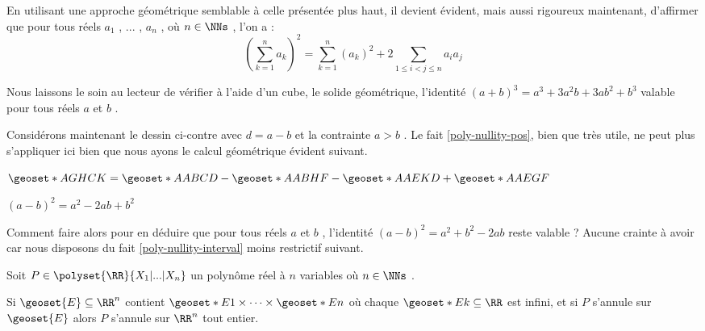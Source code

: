 

\begin{example}
	En utilisant une approche géométrique semblable à celle présentée plus haut, il devient évident, mais aussi rigoureux maintenant, d'affirmer que pour tous réels $a_1$ , ... , $a_n$ , où $n \in \NNs$ , l'on a :
\[
	\left( \sum_{k=1}^{n}a_k \right)^2
	=
	\sum_{k=1}^{n} \left( a_k \right)^2
	+
	2 \sum_{1 \leq i < j \leq n} a_i a_j
\]
\end{example}




\begin{example}
	Nous laissons le soin au lecteur de vérifier à l'aide d'un cube, le solide géométrique, l'identité $(a + b)^3 = a^3 + 3 a^2 b + 3 a b^2 + b^3$ valable pour tous réels $a$ et $b$ .
\end{example}




\medskip


\begin{figure} 
	\vspace{-.5em}
	\begin{center}
	\end{center}
	\vspace{-1.25em}
\end{figure} 


Considérons maintenant le dessin ci-contre avec $d = a - b$ et la contrainte $a > b$ . Le fait \ref{poly-nullity-pos}, bien que très utile, ne peut plus s'appliquer ici bien que nous ayons le calcul géométrique évident suivant.

\smallskip

$\geoset*{A}{GHCK} = \geoset*{A}{ABCD} - \geoset*{A}{ABHF} - \geoset*{A}{AEKD} + \geoset*{A}{AEGF}$
	
\smallskip
	
$(a-b)^2 = a^2 - 2ab + b^2$


\medskip

Comment faire alors pour en déduire que pour tous réels $a$ et $b$ , l'identité $(a - b)^2 = a^2 + b^2 - 2ab$ reste valable ?
Aucune crainte à avoir car nous disposons du fait \ref{poly-nullity-interval} moins restrictif suivant. 


\medskip

\begin{fact} \label{poly-nullity-interval}
	Soit $P \in \polyset{\RR}{X_1 | ... | X_n}$ un polynôme réel à $n$ variables où $n \in \NNs$ .
	
	\smallskip
	
	Si $\geoset{E} \subseteq \RR^n$ contient $\geoset*{E}{1} \times \cdots \times \geoset*{E}{n}$ où chaque $\geoset*{E}{k} \subseteq \RR$ est infini,
	et si $P$ s'annule sur $\geoset{E}$ alors $P$ s'annule sur $\RR^n$ tout entier. 
\end{fact}


